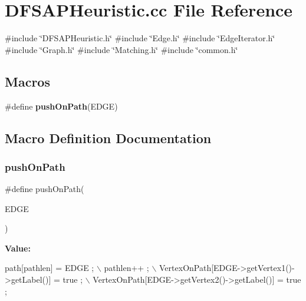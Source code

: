 \section{D\+F\+S\+A\+P\+Heuristic.\+cc File Reference}
\label{DFSAPHeuristic_8cc}
{\ttfamily \#include \char`\"{}D\+F\+S\+A\+P\+Heuristic.\+h\char`\"{}}\newline
{\ttfamily \#include \char`\"{}Edge.\+h\char`\"{}}\newline
{\ttfamily \#include \char`\"{}Edge\+Iterator.\+h\char`\"{}}\newline
{\ttfamily \#include \char`\"{}Graph.\+h\char`\"{}}\newline
{\ttfamily \#include \char`\"{}Matching.\+h\char`\"{}}\newline
{\ttfamily \#include \char`\"{}common.\+h\char`\"{}}\newline
\subsection*{Macros}
\begin{DoxyCompactItemize}
\item 
\#define \textbf{ push\+On\+Path}(E\+D\+GE)
\end{DoxyCompactItemize}


\subsection{Macro Definition Documentation}
\mbox{\label{DFSAPHeuristic_8cc_a7d1618ffd86e73ed7df2c8f92df7b38b}} 
\subsubsection{push\+On\+Path}
{\footnotesize\ttfamily \#define push\+On\+Path(\begin{DoxyParamCaption}\item[{}]{E\+D\+GE }\end{DoxyParamCaption})}

{\bfseries Value\+:}
\begin{DoxyCode}
path[pathlen] = EDGE ; \(\backslash\)
pathlen++ ; \(\backslash\)
VertexOnPath[EDGE->getVertex1()->getLabel()] = true ; \(\backslash\)
VertexOnPath[EDGE->getVertex2()->getLabel()] = true ;
\end{DoxyCode}
